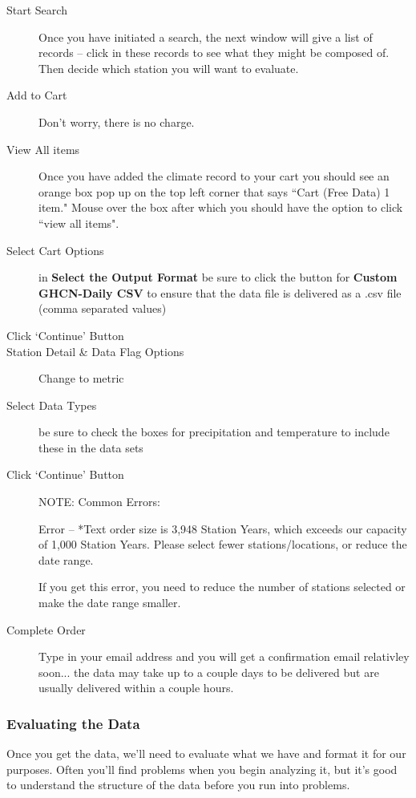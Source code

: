\documentclass{article}\usepackage[]{graphicx}\usepackage[]{color}
\begin{document}
\begin{description}
  \item[Start Search] Once you have initiated a search, the next window will give a list of records -- click in these records to see what they might be composed of. Then decide which station you will want to evaluate.
  \item[Add to Cart] Don't worry, there is no charge. 
  \item[View All items] Once you have added the climate record to your cart you should see an orange box pop up on the top left corner that says ``Cart (Free Data) 1 item." Mouse over the box after which you should have the option to click ``view all items".
  \item[Select Cart Options] in \textbf{Select the Output Format} be sure to click the button for \textbf{Custom GHCN-Daily CSV} to ensure that the data file is delivered as a .csv file (comma separated values)
  \item[Click `Continue' Button]
  \item[Station Detail \& Data Flag Options] Change to metric
  \item[Select Data Types] be sure to check the boxes for precipitation and temperature to include these in the data sets
  \item[Click `Continue' Button]
  
  NOTE: Common Errors:
  
Error -- *Text order size is 3,948 Station Years, which exceeds our capacity of 1,000 Station Years. Please select fewer stations/locations, or reduce the date range.

If you get this error, you need to reduce the number of stations selected or make the date range smaller.
  
  \item[Complete Order] Type in your email address and you will get a confirmation email relativley soon... the data may take up to a couple days to be delivered but are usually delivered within a couple hours.
\end{description}


\subsubsection{Evaluating the Data}

Once you get the data, we'll need to evaluate what we have and format it for our purposes. Often you'll find problems when you begin analyzing it, but it's good to understand the structure of the data before you run into problems. 
\end{document}
